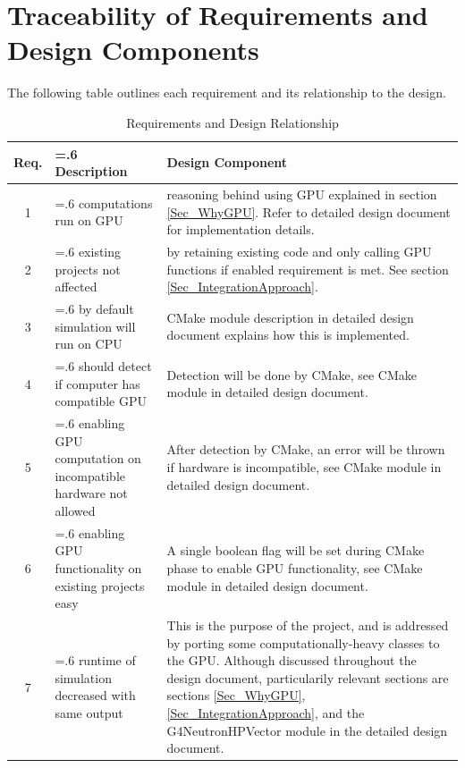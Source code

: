 \documentclass[12pt]{article}
\begin{document}
\section{Traceability of Requirements and Design Components}%
The following table outlines each requirement and its relationship to the design.

\begin{table}[h]
\centering
\caption{Requirements and Design Relationship}\label{Table_RequirementsAndDesign}

\begin{tabularx}{\textwidth}{c>{\hsize=.6\hsize}X>{\hsize=1.4\hsize}X}
\toprule
\bf Req. & \bf Description & \bf Design Component\\\midrule
\arrayrulecolor{lightgray}
1  & computations run on GPU & reasoning behind using GPU explained in section \ref{Sec_WhyGPU}. Refer to detailed design document for implementation details.\\\hline

2  & existing projects not affected & by retaining existing code and only calling GPU functions if enabled requirement is met. See section \ref{Sec_IntegrationApproach}.\\\hline

3  & by default simulation will run on CPU & CMake module description in detailed design document explains how this is implemented.\\\hline

4  & should detect if computer has compatible GPU & Detection will be done by CMake, see CMake module in detailed design document.\\\hline

5  & enabling GPU computation on incompatible hardware not allowed & After detection by CMake, an error will be thrown if hardware is incompatible, see CMake module in detailed design document.\\\hline

6  & enabling GPU functionality on existing projects easy & A single boolean flag will be set during CMake phase to enable GPU functionality, see CMake module in detailed design document.\\\hline

7 & runtime of simulation decreased with same output & This is the purpose of the project, and is addressed by porting some computationally-heavy classes to the GPU. Although discussed throughout the design document, particularily relevant sections are sections \ref{Sec_WhyGPU}, \ref{Sec_IntegrationApproach}, and the G4NeutronHPVector module in the detailed design document.\\\hline


\end{tabularx}
\end{table}
\end{document}
